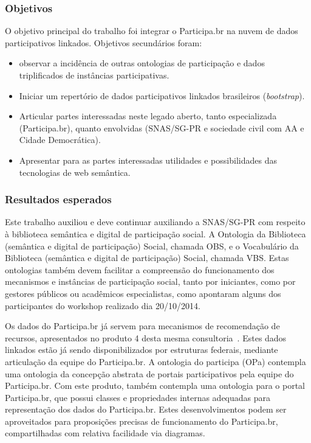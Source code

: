 \documentclass[12pt]{article}
\begin{document}
\subsubsection{Objetivos}
O objetivo principal do trabalho foi integrar o Participa.br na nuvem de dados participativos linkados. Objetivos secundários foram:
\begin{itemize}
    \item observar a incidência de outras ontologias de participação e dados triplificados de instâncias participativas.
    \item Iniciar um repertório de dados participativos linkados brasileiros (\emph{bootstrap}).
    \item Articular partes interessadas neste legado aberto, tanto especializada (Participa.br), quanto envolvidas (SNAS/SG-PR e sociedade civil com AA e Cidade Democrática).
    \item Apresentar para as partes interessadas utilidades e possibilidades das tecnologias de web semântica.
\end{itemize}

\subsubsection{Resultados esperados}\label{subsec:resp}
Este trabalho auxiliou e deve continuar auxiliando a SNAS/SG-PR com respeito à biblioteca semântica e digital de participação social. A Ontologia da Biblioteca (semântica e digital de participação) Social, chamada OBS, e o Vocabulário da Biblioteca (semântica e digital de participação) Social, chamada VBS. Estas ontologias também devem facilitar a compreensão do funcionamento dos mecanismos e instâncias de participação social, tanto por iniciantes, como por gestores públicos ou acadêmicos especialistas, como apontaram alguns dos participantes do workshop realizado dia 20/10/2014.

Os dados do Participa.br já servem para mecanismos de recomendação de recursos, apresentados no produto 4 desta mesma consultoria~\cite{repoProd4}. Estes dados linkados estão já sendo disponibilizados por estruturas federais, mediante articulação da equipe do Participa.br. A ontologia do participa (OPa) contempla uma ontologia da concepção abstrata de portais participativos pela equipe do Participa.br. Com este produto, também contempla uma ontologia para o portal Participa.br, que possui classes e propriedades internas adequadas para representação dos dados do Participa.br. Estes desenvolvimentos podem ser aproveitados para proposições precisas de funcionamento do Participa.br, compartilhadas com relativa facilidade via diagramas.
\end{document}
